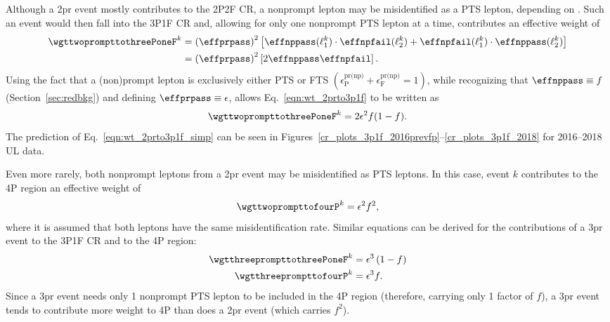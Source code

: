 Although a 2pr event mostly contributes to the 2P2F CR, a nonprompt lepton may be misidentified as a PTS lepton, depending on \effnppass.
Such an event would then fall into the 3P1F CR and, allowing for only one nonprompt PTS lepton at a time, contributes an effective weight of
\begin{align}
	\label{eqn:wt_2prto3p1f}
	\wgttwoprompttothreePoneF^k
	&= \left( \effprpass \right)^2 
	\left[
		\effnppass(\ell_1^k) \cdot \effnpfail(\ell_2^k) + \effnpfail(\ell_1^k) \cdot \effnppass(\ell_2^k)
	\right]
	\notag
	\\
	&= \left( \effprpass \right)^2
	\left[
		2 \effnppass \effnpfail
	\right].
\end{align}
Using the fact that a (non)prompt lepton is exclusively either PTS or FTS
$\left( \epsilon^\text{pr(np)}_\text{P} + \epsilon^\text{pr(np)}_\text{F} = 1 \right)$,
while recognizing that $\effnppass \equiv f$ (Section~\ref{sec:redbkg}) and defining $\effprpass \equiv \epsilon$,
allows Eq.~\ref{eqn:wt_2prto3p1f} to be written as
\begin{equation}
	\label{eqn:wt_2prto3p1f_simp}
	\wgttwoprompttothreePoneF^k = 2 \epsilon^2 f (1-f).
\end{equation}
The prediction of Eq.~\ref{eqn:wt_2prto3p1f_simp} can be seen in Figures~\ref{cr_plots_3p1f_2016prevfp}--\ref{cr_plots_3p1f_2018} for 2016--2018 UL data.

Even more rarely, both nonprompt leptons from a 2pr event may be misidentified as PTS leptons.
In this case, event $k$ contributes to the 4P region an effective weight of
\begin{equation}
	\label{eqn:wt_2prto4p}
	\wgttwoprompttofourP^k = \epsilon^2 f^2,
\end{equation}
where it is assumed that both leptons have the same misidentification rate.
Similar equations can be derived for the contributions of a 3pr event to the 3P1F CR and to the 4P region:
\begin{align}
	\label{eqn:wt_3prto3p1f}
	\wgtthreeprompttothreePoneF^k &= \epsilon^3 \left( 1-f \right)
	\\
	\label{eqn:wt_3prto4p}
	\wgtthreeprompttofourP^k &= \epsilon^3 f.
\end{align}
Since a 3pr event needs only 1 nonprompt PTS lepton to be included in the 4P region (therefore, carrying only 1 factor of $f$), a 3pr event tends to contribute more weight to 4P than does a 2pr event (which carries $f^2$).

